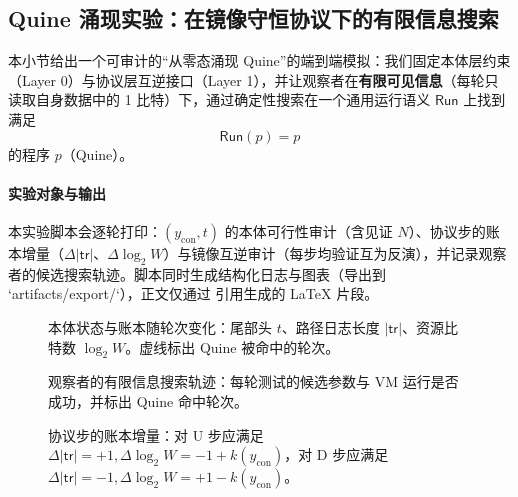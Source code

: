 \subsection{Quine 涌现实验：在镜像守恒协议下的有限信息搜索}\label{subsec:quine_emergence_experiment}
本小节给出一个可审计的“从零态涌现 Quine”的端到端模拟：我们固定本体层约束（Layer 0）与协议层互逆接口（Layer 1），并让观察者在\textbf{有限可见信息}（每轮只读取自身数据中的 1 比特）下，通过确定性搜索在一个通用运行语义 \(\mathsf{Run}\) 上找到满足
$$
\mathsf{Run}(p)=p
$$
的程序 \(p\)（Quine）。

\paragraph{实验对象与输出} 本实验脚本会逐轮打印：\((y_{\mathrm{con}},t)\) 的本体可行性审计（含见证 \(N\)）、协议步的账本增量（\(\Delta|\mathsf{tr}|\)、\(\Delta\log_2 W\)）与镜像互逆审计（每步均验证互为反演），并记录观察者的候选搜索轨迹。脚本同时生成结构化日志与图表（导出到 `artifacts/export/`），正文仅通过 \verb|| 引用生成的 LaTeX 片段。

\begin{table}[H]
\centering
\small
\setlength{\tabcolsep}{6pt}

\caption{Quine 涌现实验的参数与结果摘要（脚本输出）。}
\label{tab:quine_emergence_summary}
\end{table}

\begin{table}[H]
\centering
\small
\setlength{\tabcolsep}{5pt}

\caption{Quine 涌现实验的轮次摘录：展示协议步（U/D）、账本演化与搜索候选的更新过程。}
\label{tab:quine_emergence_excerpt}
\end{table}

\begin{figure}[H]
\centering

\caption{本体状态与账本随轮次变化：尾部头 \(t\)、路径日志长度 \(|\mathsf{tr}|\)、资源比特数 \(\log_2 W\)。虚线标出 Quine 被命中的轮次。}
\label{fig:quine_emergence_state_timeseries}
\end{figure}

\begin{figure}[H]
\centering

\caption{观察者的有限信息搜索轨迹：每轮测试的候选参数与 VM 运行是否成功，并标出 Quine 命中轮次。}
\label{fig:quine_emergence_search_trace}
\end{figure}

\begin{figure}[H]
\centering

\caption{协议步的账本增量：对 U 步应满足 \(\Delta|\mathsf{tr}|=+1,\Delta\log_2 W=-1+k(y_{\mathrm{con}})\)，对 D 步应满足 \(\Delta|\mathsf{tr}|=-1,\Delta\log_2 W=+1-k(y_{\mathrm{con}})\)。}
\label{fig:quine_emergence_ledger_deltas}
\end{figure}


